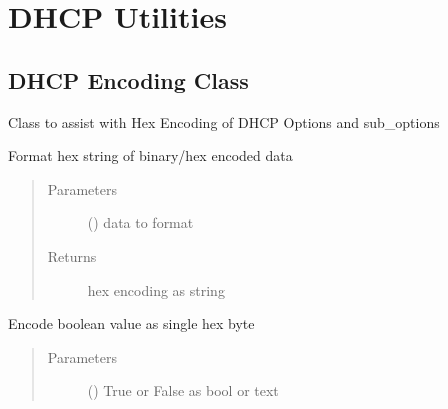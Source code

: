 \documentclass[letterpaper,10pt,english]{sphinxmanual}
\begin{document}
\chapter{DHCP Utilities}
\label{\detokenize{dhcp-utils-classes:dhcp-utilities}}\label{\detokenize{dhcp-utils-classes::doc}}

\section{DHCP Encoding Class}
\label{\detokenize{dhcp_encode-class:dhcp-encoding-class}}\label{\detokenize{dhcp_encode-class::doc}}

\begin{fulllineitems}
\label{\detokenize{dhcp_encode-class:bloxone.dhcp_encode}}
\sphinxAtStartPar
Class to assist with Hex Encoding of
DHCP Options and sub\_options

\begin{fulllineitems}
\label{\detokenize{dhcp_encode-class:bloxone.dhcp_encode.binary_to_hex}}
\sphinxAtStartPar
Format hex string of binary/hex encoded data
\begin{quote}\begin{description}
\item[{Parameters}] \leavevmode
\sphinxAtStartPar
{} () \textendash{} data to format

\item[{Returns}] \leavevmode
\sphinxAtStartPar
hex encoding as string

\end{description}\end{quote}

\end{fulllineitems}


\begin{fulllineitems}
\label{\detokenize{dhcp_encode-class:bloxone.dhcp_encode.boolean_to_hex}}
\sphinxAtStartPar
Encode boolean value as single hex byte
\begin{quote}\begin{description}
\item[{Parameters}] \leavevmode
\sphinxAtStartPar
{} () \textendash{} True or False as bool or text


\end{description}
\end{quote}
\end{fulllineitems}
\end{fulllineitems}
\end{document}
